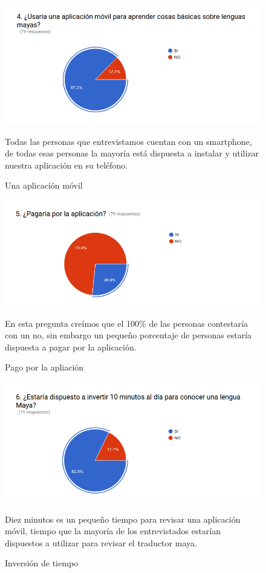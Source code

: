 \documentclass[a4paper,openright,11pt]{article}
\begin{document}
\begin{figure}
	\centering
	\includegraphics[width=1.0\textwidth]{e4}
	\caption{Una aplicación móvil}
	\label{fig:e4}
	Todas las personas que entrevistamos cuentan con un smartphone, de todas esas personas la mayoría está dispuesta a instalar y utilizar nuestra aplicación en su teléfono.
\end{figure}
\begin{figure}
	\centering
	\includegraphics[width=1.0\textwidth]{e5}
	\caption{Pago por la apliación}
	\label{fig:e5}
	En esta pregunta creímos que el 100\% de las personas contestaría con un no, sin embargo un pequeño porcentaje de personas estaría dispuesta a pagar por la aplicación.
\end{figure}
\begin{figure}
	\centering
	\includegraphics[width=1.0\textwidth]{e6}
	\caption{Inversión de tiempo}
	\label{fig:e6}
	Diez minutos es un pequeño tiempo para revisar una aplicación móvil, tiempo que la mayoría de los entrevistados estarían dispuestos a utilizar para revisar el traductor maya.
\end{figure}
\end{document}
